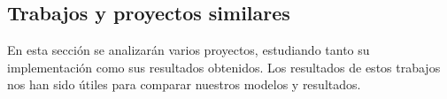 \subsection{Trabajos y proyectos similares}\label{similar_projects}

En esta sección se analizarán varios proyectos, estudiando tanto su implementación como sus resultados obtenidos. Los resultados de estos trabajos nos han sido útiles para comparar nuestros modelos y resultados.



